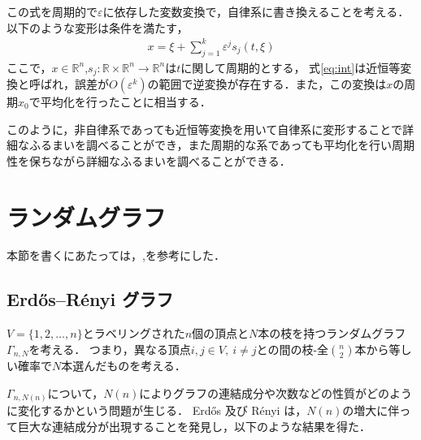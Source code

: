 \documentclass[../main]{subfiles}
\begin{document}
この式を周期的で$\varepsilon$に依存した変数変換で，自律系に書き換えることを考える．
以下のような変形は条件を満たす，
\begin{align}
    \label{eq:int}
    x=\xi+\sum_{j=1}^k \varepsilon^j s_j(t,\xi)
\end{align}
ここで，$x\in\mathbb{R}^n$,$s_j:\mathbb{R}\times\mathbb{R}^n\to\mathbb{R}^n$は$t$に関して周期的とする，
式\eqref{eq:int}は近恒等変換と呼ばれ，誤差が$O(\varepsilon^k)$の範囲で逆変換が存在する．また，この変換は$x$の周期$x_0$で平均化を行ったことに相当する．

このように，非自律系であっても近恒等変換を用いて自律系に変形することで詳細なふるまいを調べることができ，また周期的な系であっても平均化を行い周期性を保ちながら詳細なふるまいを調べることができる．
\section{ランダムグラフ}
本節を書くにあたっては，\cite{Bollobas2013},\cite{Albert2002}を参考にした．
\subsection{Erd\H{o}s–R\'{e}nyi グラフ}
$V=\{1,2,\ldots,n\}$とラベリングされた$n$個の頂点と$N$本の枝を持つランダムグラフ$\Gamma_{n,N}$を考える．
つまり，異なる頂点$i,j\in V,\ i\neq j$との間の枝-全$\binom{n}{2}$本から等しい確率で$N$本選んだものを考える．

$\Gamma_{n,N(n)}$について，$N(n)$によりグラフの連結成分や次数などの性質がどのように変化するかという問題が生じる．
Erd\H{o}s 及び R\'{e}nyi は，$N(n)$の増大に伴って巨大な連結成分が出現することを発見し，以下のような結果を得た．
\end{document}
